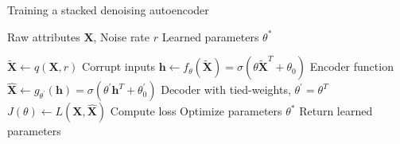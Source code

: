 %
%
%
%
%

\begin{algorithm}
    \caption{Training a stacked denoising autoencoder}
    \label{algo:sdae}
    \begin{algorithmic}[1]
    
    \INPUT Raw attributes $\mathbf{X}$, Noise rate $r$
    \OUTPUT Learned parameters $\theta^{\ast}$

    \item[]
    \State $\mathbf{\widetilde{X}} \gets q(\mathbf{X}, r)$
    \Comment Corrupt inputs
        \State $\mathbf{h} \gets f_{\theta}(\mathbf{\widetilde{X}}) = \sigma(\theta\mathbf{\widetilde{X}}^{T} + \theta_0)$
        \Comment Encoder function
        \State $\mathbf{\widehat{X}} \gets g_{\theta^{\prime}}(\mathbf{h}) = \sigma(\theta^{\prime} \mathbf{h}^{T} + \theta^{\prime}_{0})$
        \Comment Decoder with tied-weights, $\theta^{\prime}=\theta^{T}$
        \State $J(\theta) \gets L(\mathbf{X}, \mathbf{\widehat{X}})$
        \Comment Compute loss
        \State {}
        \Comment Optimize parameters
    \EndFor
    \State \Return $\theta^{\ast}$
    \Comment Return learned parameters
    \end{algorithmic}
\end{algorithm}
